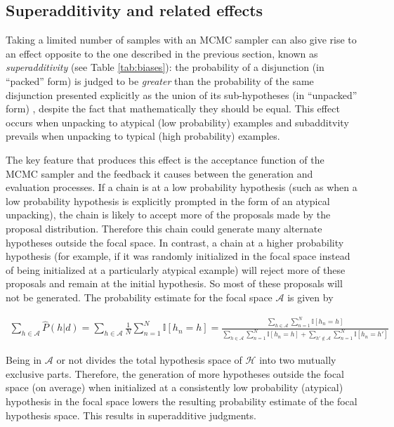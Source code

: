 \subsection{Superadditivity and related effects}

Taking a limited number of samples with an MCMC sampler can also give rise to an effect opposite to the one described in the previous section, known as \emph{superadditivity} (see Table \ref{tab:biases}): the probability of a disjunction (in ``packed'' form) is judged to be \textit{greater} than the probability of the same disjunction presented explicitly as the union of its sub-hypotheses (in ``unpacked'' form) \citep{super,hadjichristidis1999opening}, despite the fact that mathematically they should be equal. This effect occurs when  unpacking to atypical (low probability) examples and subadditvity prevails when unpacking to typical (high probability) examples.

The key feature that produces this effect is the acceptance function of the MCMC sampler and the feedback it causes between the generation and evaluation processes. If a chain is at a low probability hypothesis (such as when a low probability hypothesis is explicitly prompted in the form of an atypical unpacking), the chain is likely to accept more of the proposals made by the proposal distribution. Therefore this chain could generate many alternate hypotheses outside the focal space. In contrast, a chain at a higher probability hypothesis (for example, if it was randomly initialized in the focal space instead of being initialized at a particularly atypical example) will reject more of these proposals and remain at the initial hypothesis. So most of these proposals will not be generated. The probability estimate for the focal space $\mathcal{A}$ is given by 

\begin{align}
\sum_{h \in \mathcal{A}} \hat{P}(h | d) = 
\sum_{h \in \mathcal{A}}\frac{1}{N}\sum_{n=1}^N \mathbb{I}[h_n=h] = 
\frac{\sum_{h \in \mathcal{A}} \sum_{n=1}^N \mathbb{I}[h_n=h]}
{\sum_{h \in \mathcal{A}} \sum_{n=1}^N \mathbb{I}[h_n=h] + \sum_{h' \notin \mathcal{A}} \sum_{n=1}^N \mathbb{I}[h_n=h']}
\end{align}

Being in $\mathcal{A}$ or not divides the total hypothesis space of $\mathcal{H}$ into two mutually exclusive parts. Therefore, the generation of more hypotheses outside the focal space (on average) when initialized at a consistently low probability (atypical) hypothesis in the focal space lowers the resulting probability estimate of the focal hypothesis space. This results in superadditive judgments.
 

